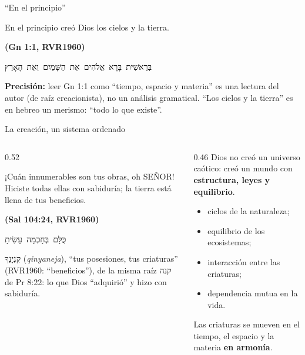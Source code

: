 \documentclass[hyperref={bookmarks=false},aspectratio=169]{beamer}
\newcommand{\heb}[1]{\mbox{\foreignlanguage{hebrew}{#1}}}
\newcommand{\SENOR}{S{\fontsize{0.78em}{1em}\selectfont EÑOR}}
\newcommand{\fuente}[1]{\par\hfill{\upshape\bfseries\footnotesize\textcolor{azul}{#1}}}
\newcommand{\destacar}[1]{\textbf{\textcolor{azul}{#1}}}
\newcommand{\precision}[1]{{\footnotesize\color{gris}\textbf{Precisión:} #1}}
\begin{document}
\begin{frame}{``En el principio''}
\begin{cita}En el principio creó Dios los cielos y la tierra.\fuente{(Gn 1:1, RVR1960)}\end{cita}
\begin{center}\heb{בְּרֵאשִׁית בָּרָא אֱלֹהִים אֵת הַשָּׁמַיִם וְאֵת הָאָרֶץ}\end{center}
\centering
{}\par\medskip
\precision{leer Gn 1:1 como ``tiempo, espacio y materia'' es una lectura del autor (de raíz creacionista), no un análisis gramatical. ``Los cielos y la tierra'' es en hebreo un merismo: ``todo lo que existe''.}
\end{frame}

\begin{frame}{La creación, un sistema ordenado}
\begin{columns}[t,onlytextwidth]
\begin{column}{0.52\textwidth}
\begin{cita}¡Cuán innumerables son tus obras, oh \SENOR! Hiciste todas ellas con sabiduría; la tierra está llena de tus beneficios.\fuente{(Sal 104:24, RVR1960)}\end{cita}
\begin{center}\heb{כֻּלָּם בְּחָכְמָה עָשִׂיתָ}\end{center}
\scriptsize \heb{קִנְיָנֶךָ} (\emph{qinyaneja}), ``tus posesiones, tus criaturas'' (RVR1960: ``beneficios''), de la misma raíz \heb{קנה} de Pr 8:22: lo que Dios ``adquirió'' y hizo con sabiduría.
\end{column}
\begin{column}{0.46\textwidth}\small
Dios no creó un universo caótico: creó un mundo con \destacar{estructura, leyes y equilibrio}.
\begin{itemize}
\item ciclos de la naturaleza;
\item equilibrio de los ecosistemas;
\item interacción entre las criaturas;
\item dependencia mutua en la vida.
\end{itemize}
Las criaturas se mueven en el tiempo, el espacio y la materia \destacar{en armonía}.
\end{column}
\end{columns}
\end{frame}
\end{document}
